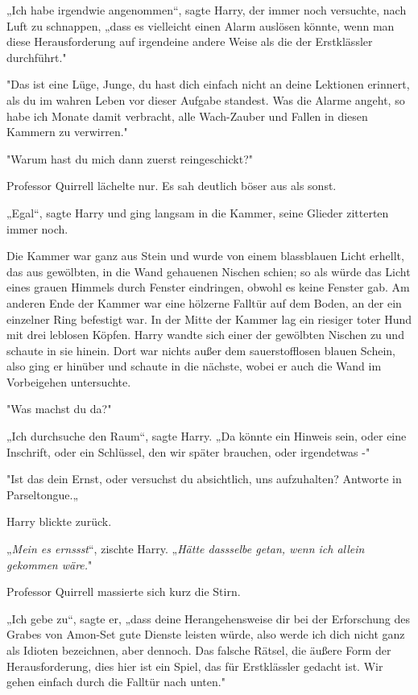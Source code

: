 {„Ich habe irgendwie angenommen“, sagte Harry, der immer noch versuchte, nach Luft zu schnappen, „dass es vielleicht einen Alarm auslösen könnte, wenn man diese Herausforderung auf irgendeine andere Weise als die der Erstklässler durchführt."

"Das ist eine Lüge, Junge, du hast dich einfach nicht an deine Lektionen erinnert, als du im wahren Leben vor dieser Aufgabe standest. Was die Alarme angeht, so habe ich Monate damit verbracht, alle Wach-Zauber und Fallen in diesen Kammern zu verwirren."

"Warum hast du mich dann zuerst reingeschickt?"

Professor Quirrell lächelte nur. Es sah deutlich böser aus als sonst.

„Egal“, sagte Harry und ging langsam in die Kammer, seine Glieder zitterten immer noch.

Die Kammer war ganz aus Stein und wurde von einem blassblauen Licht erhellt, das aus gewölbten, in die Wand gehauenen Nischen schien; so als würde das Licht eines grauen Himmels durch Fenster eindringen, obwohl es keine Fenster gab. Am anderen Ende der Kammer war eine hölzerne Falltür auf dem Boden, an der ein einzelner Ring befestigt war. In der Mitte der Kammer lag ein riesiger toter Hund mit drei leblosen Köpfen. Harry wandte sich einer der gewölbten Nischen zu und schaute in sie hinein. Dort war nichts außer dem sauerstofflosen blauen Schein, also ging er hinüber und schaute in die nächste, wobei er auch die Wand im Vorbeigehen untersuchte.

"Was machst du da?"

„Ich durchsuche den Raum“, sagte Harry. „Da könnte ein Hinweis sein, oder eine Inschrift, oder ein Schlüssel, den wir später brauchen, oder irgendetwas -"

"Ist das dein Ernst, oder versuchst du absichtlich, uns aufzuhalten? Antworte in Parseltongue.„

Harry blickte zurück.

„\emph{Mein es ernssst}“, zischte Harry. „\emph{Hätte dassselbe getan, wenn ich allein gekommen wäre.}"

Professor Quirrell massierte sich kurz die Stirn.

„Ich gebe zu“, sagte er, „dass deine Herangehensweise dir bei der Erforschung des Grabes von Amon-Set gute Dienste leisten würde, also werde ich dich nicht ganz als Idioten bezeichnen, aber dennoch. Das falsche Rätsel, die äußere Form der Herausforderung, dies hier ist ein Spiel, das für Erstklässler gedacht ist. Wir gehen einfach durch die Falltür nach unten."

}

